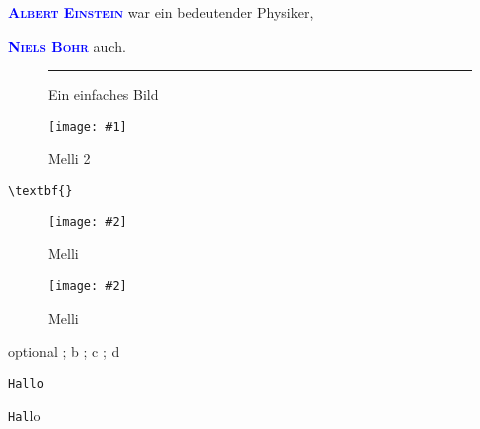 \documentclass[12pt,ngerman]{scrartcl}
\newcommand{\test}[4][1.0]%
{%
{#1 ; #2 ; #3 ; #4}
}
\newcommand{\bild}{%
\textcolor{lime}{\rule{8cm}{6cm}}}
\newcommand{\latexbefehl}[1]{\texttt{\textbackslash #1}}
\newcommand{\person}[1]{\textcolor{red}{\textsc{\bfseries #1}}}
\renewcommand{\person}[1]{\textcolor{blue}{\textsc{\bfseries #1}}}
\newcommand{\image}[2]{%
\begin{figure}
\centering
\texttt{[image: \#1]}
\caption{#2}\label{fig:#1}
\end{figure}
}
\newcommand{\imagew}[3][1.0]{%
\begin{figure}
\centering
\texttt{[image: \#2]}
\caption{#3}\label{fig:#2}
\end{figure}
}
\begin{document}
\person{Albert Einstein} war ein bedeutender Physiker,

\person{Niels Bohr} auch.

\begin{figure}
\centering
\bild
\caption{Ein einfaches Bild}
\end{figure}

\image{./bilder/Katze}{Melli 2}

\pageref{fig:Katze}

\latexbefehl{textbf\{\}}

\imagew[0.5]{Katze}{Melli}

\imagew{Katze}{Melli}

\test[optional]{b}{c}{d}


\texttt{Hallo}

\texttt {Hal}lo 
\end{document}
